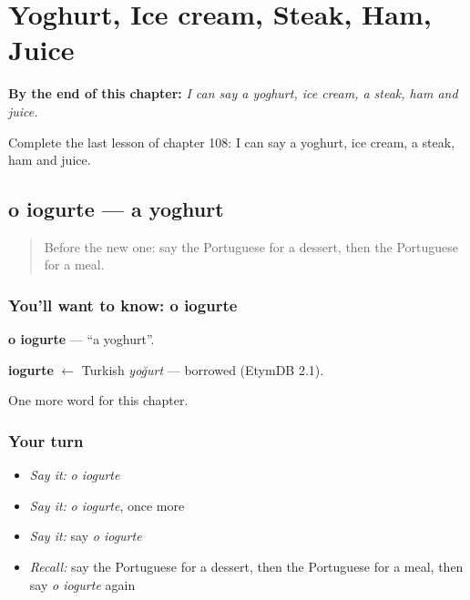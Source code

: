 
\chapter{Yoghurt, Ice cream, Steak, Ham, Juice}
\label{ch:pt-yoghurt-ice-cream-steak-ham-juice}

\begin{chapteropening}
\textbf{By the end of this chapter:} \emph{I can say a yoghurt, ice cream, a steak, ham and juice.}

Complete the last lesson of chapter 108: I can say a yoghurt, ice cream, a steak, ham and juice.
\end{chapteropening}

\section[o iogurte]{o iogurte — a yoghurt}

\label{lesson:PT-C108-iogurte}



\begin{quote}
Before the new one: say the Portuguese for a dessert, then the Portuguese for a meal.
\end{quote}

\subsection*{You'll want to know: o iogurte}
\textbf{o iogurte} — \textquotedblleft{}a yoghurt\textquotedblright{}.

\begin{cousinweb}
\textbf{iogurte} $\leftarrow$ Turkish \emph{yoğurt} — borrowed (EtymDB 2.1).
\end{cousinweb}

\begin{grammarlens}[title={What you've built}]
One more word for this chapter.
\end{grammarlens}

\subsection*{Your turn}
\begin{itemize}
\raggedright
  \item \emph{Say it:} \emph{o iogurte}
  \item \emph{Say it:} \emph{o iogurte}, once more
  \item \emph{Say it:} say \emph{o iogurte}
  \item \emph{Recall:} say the Portuguese for a dessert, then the Portuguese for a meal, then say \emph{o iogurte} again
\end{itemize}

